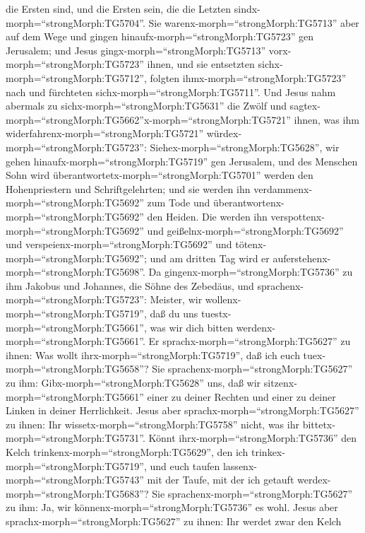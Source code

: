die Ersten sind, und die Ersten sein, die die Letzten
sindx-morph=``strongMorph:TG5704''.  Sie
warenx-morph=``strongMorph:TG5713'' aber auf dem Wege und gingen
hinaufx-morph=``strongMorph:TG5723'' gen Jerusalem; und Jesus
gingx-morph=``strongMorph:TG5713'' vorx-morph=``strongMorph:TG5723''
ihnen, und sie entsetzten sichx-morph=``strongMorph:TG5712'', folgten
ihmx-morph=``strongMorph:TG5723'' nach und fürchteten
sichx-morph=``strongMorph:TG5711''. Und Jesus nahm abermals zu
sichx-morph=``strongMorph:TG5631'' die Zwölf und
sagtex-morph=``strongMorph:TG5662''x-morph=``strongMorph:TG5721'' ihnen,
was ihm widerfahrenx-morph=``strongMorph:TG5721''
würdex-morph=``strongMorph:TG5723'': 
Siehex-morph=``strongMorph:TG5628'', wir gehen
hinaufx-morph=``strongMorph:TG5719'' gen Jerusalem, und des Menschen
Sohn wird überantwortetx-morph=``strongMorph:TG5701'' werden den
Hohenpriestern und Schriftgelehrten; und sie werden ihn
verdammenx-morph=``strongMorph:TG5692'' zum Tode und
überantwortenx-morph=``strongMorph:TG5692'' den Heiden. 
Die werden ihn verspottenx-morph=``strongMorph:TG5692'' und
geißelnx-morph=``strongMorph:TG5692'' und
verspeienx-morph=``strongMorph:TG5692'' und
tötenx-morph=``strongMorph:TG5692''; und am dritten Tag wird er
auferstehenx-morph=``strongMorph:TG5698''.  Da
gingenx-morph=``strongMorph:TG5736'' zu ihm Jakobus und Johannes, die
Söhne des Zebedäus, und sprachenx-morph=``strongMorph:TG5723'': Meister,
wir wollenx-morph=``strongMorph:TG5719'', daß du uns
tuestx-morph=``strongMorph:TG5661'', was wir dich bitten
werdenx-morph=``strongMorph:TG5661''.  Er
sprachx-morph=``strongMorph:TG5627'' zu ihnen: Was wollt
ihrx-morph=``strongMorph:TG5719'', daß ich euch
tuex-morph=``strongMorph:TG5658''?  Sie
sprachenx-morph=``strongMorph:TG5627'' zu ihm:
Gibx-morph=``strongMorph:TG5628'' uns, daß wir
sitzenx-morph=``strongMorph:TG5661'' einer zu deiner Rechten und einer
zu deiner Linken in deiner Herrlichkeit.  Jesus aber
sprachx-morph=``strongMorph:TG5627'' zu ihnen: Ihr
wissetx-morph=``strongMorph:TG5758'' nicht, was ihr
bittetx-morph=``strongMorph:TG5731''. Könnt
ihrx-morph=``strongMorph:TG5736'' den Kelch
trinkenx-morph=``strongMorph:TG5629'', den ich
trinkex-morph=``strongMorph:TG5719'', und euch taufen
lassenx-morph=``strongMorph:TG5743'' mit der Taufe, mit der ich getauft
werdex-morph=``strongMorph:TG5683''?  Sie
sprachenx-morph=``strongMorph:TG5627'' zu ihm: Ja, wir
könnenx-morph=``strongMorph:TG5736'' es wohl. Jesus aber
sprachx-morph=``strongMorph:TG5627'' zu ihnen: Ihr werdet zwar den Kelch
